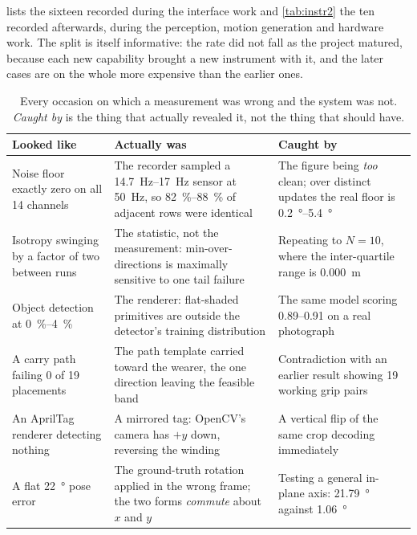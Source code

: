  lists the sixteen recorded during the interface work and
\cref{tab:instr2} the ten recorded afterwards, during the perception, motion
generation and hardware work. The split is itself informative: the rate did not
fall as the project matured, because each new capability brought a new
instrument with it, and the later cases are on the whole more expensive than
the earlier ones.

\begin{table}[htbp]
  \centering
  \caption{Every occasion on which a measurement was wrong and the system was
  not. \emph{Caught by} is the thing that actually revealed it, not the thing
  that should have.}
  \label{tab:instr}
  \footnotesize
  \begin{tabular}{@{}p{32mm}p{45mm}p{45mm}@{}}
    \toprule
    Looked like & Actually was & Caught by \\
    \midrule
    Noise floor exactly zero on all 14 channels
      & The recorder sampled a \SIrange{14.7}{17}{\hertz} sensor at
        \SI{50}{\hertz}, so \SIrange{82}{88}{\percent} of adjacent rows were
        identical
      & The figure being \emph{too} clean; over distinct updates the real
        floor is \SIrange{0.2}{5.4}{\degree} \\
    Isotropy swinging by a factor of two between runs
      & The statistic, not the measurement: min-over-directions is maximally
        sensitive to one tail failure
      & Repeating to $N=10$, where the inter-quartile range is
        \SI{0.000}{\metre} \\
    Object detection at \SIrange{0}{4}{\percent}
      & The renderer: flat-shaded primitives are outside the detector's
        training distribution
      & The same model scoring \numrange{0.89}{0.91} on a real photograph \\
    A carry path failing 0 of 19 placements
      & The path template carried toward the wearer, the one direction leaving
        the feasible band
      & Contradiction with an earlier result showing 19 working grip pairs \\
    An {AprilTag} renderer detecting nothing
      & A mirrored tag: {OpenCV}'s camera has $+y$ down, reversing the winding
      & A vertical flip of the same crop decoding immediately \\
    A flat \SI{22}{\degree} pose error
      & The ground-truth rotation applied in the wrong frame; the two forms
        \emph{commute} about $x$ and $y$
      & Testing a general in-plane axis: \SI{21.79}{\degree} against
        \SI{1.06}{\degree} \\

\end{tabular}
\end{table}

